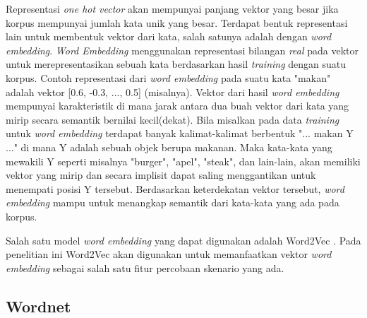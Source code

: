Representasi \textit{one hot vector} akan mempunyai panjang vektor yang besar jika korpus mempunyai jumlah kata unik yang besar. Terdapat bentuk representasi lain untuk membentuk vektor dari kata, salah satunya adalah dengan \textit{word embedding}. \textit{Word Embedding} menggunakan representasi bilangan \textit{real} pada vektor untuk merepresentasikan sebuah kata berdasarkan hasil \textit{training} dengan suatu korpus. Contoh representasi dari \textit{word embedding} pada suatu kata "makan" adalah vektor [0.6, -0.3, ..., 0.5] (misalnya). Vektor dari hasil \textit{word embedding} mempunyai karakteristik di mana jarak antara dua buah vektor dari kata yang mirip secara semantik bernilai kecil(dekat). Bila misalkan pada data \textit{training} untuk \textit{word embedding} terdapat banyak kalimat-kalimat berbentuk "... makan Y ..." di mana Y adalah sebuah objek berupa makanan. Maka kata-kata yang mewakili Y seperti misalnya "burger", "apel", "steak", dan lain-lain, akan memiliki vektor yang mirip dan secara implisit dapat saling menggantikan untuk menempati posisi Y tersebut. Berdasarkan keterdekatan vektor tersebut, \textit{word embedding} mampu untuk menangkap semantik dari kata-kata yang ada pada korpus.

Salah satu model \textit{word embedding} yang dapat digunakan adalah Word2Vec \citep{mikolov2013distributed}. Pada penelitian ini Word2Vec akan digunakan untuk memanfaatkan vektor \textit{word embedding} sebagai salah satu fitur percobaan skenario yang ada. 

\subsection{Wordnet}

